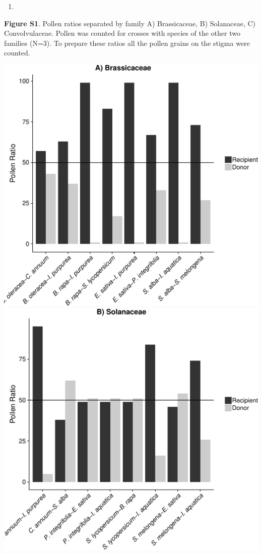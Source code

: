\documentclass[11pt,a4paper]{article}
\begin{document}
\begin{enumerate}
\def\labelenumi{\arabic{enumi}.}
\setcounter{enumi}{1}
\item
\end{enumerate}

\textbf{Figure S1}. Pollen ratios separated by family A) Brassicaceae,
B) Solanaceae, C) Convolvulaceae. Pollen was counted for crosses with
species of the other two families (N=3). To prepare these ratios all the
pollen grains on the stigma were counted.

\includegraphics{output/figures/unnamed-chunk-9-1.pdf}
\includegraphics{output/figures/unnamed-chunk-9-2.pdf}
\end{document}
